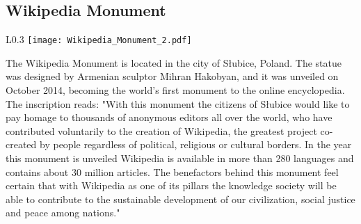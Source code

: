 \subsection* {Wikipedia Monument}

\begin{wrapfigure}{L}{0.3\textwidth}
\centering
\texttt{[image: Wikipedia\_Monument\_2.pdf]}
\end{wrapfigure}

The Wikipedia Monument is located in the city of Słubice, Poland. The statue was designed by Armenian sculptor Mihran Hakobyan, and it was unveiled on October 2014, becoming the world's first monument to the online encyclopedia. The inscription reads: "With this monument the citizens of Słubice would like to pay homage to thousands of anonymous editors all over the world, who have contributed voluntarily to the creation of Wikipedia, the greatest project co-created by people regardless of political, religious or cultural borders. In the year this monument is unveiled Wikipedia is available in more than 280 languages and contains about 30 million articles. The benefactors behind this monument feel certain that with Wikipedia as one of its pillars the knowledge society will be able to contribute to the sustainable development of our civilization, social justice and peace among nations."

